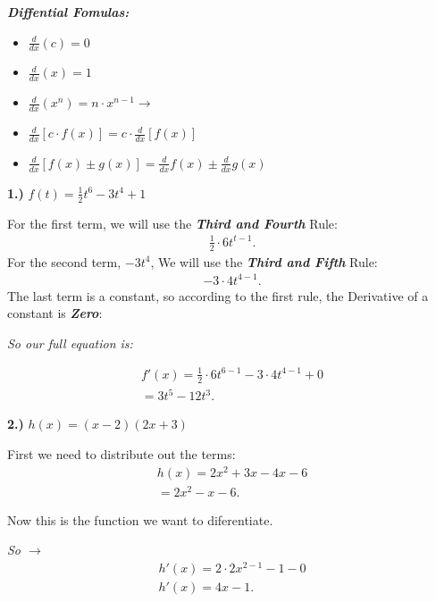 \documentclass{report}
\begin{document}
    \bigbreak \noindent 
    \begin{mdframed}
        \textbf{\textit{Diffential Fomulas:}}
        \begin{itemize}
            \item $ \frac{d}{dx}(c) = 0$
            \item $ \frac{d}{dx}(x) = 1$
            \item $ \frac{d}{dx}(x^n) = n \cdot x^{n-1} \rightarrow$ 
            \item $ \frac{d}{dx}[c \cdot f(x)] = c \cdot \frac{d}{dx}[f(x)]$
            \item $ \frac{d}{dx}[f(x) \pm g(x)] = \frac{d}{dx}f(x)\pm \frac{d}{dx}g(x)$
        \end{itemize}
    \end{mdframed}
    \bigbreak \noindent \bigbreak \noindent 
    \bigbreak \noindent 
    \begin{mdframed}
       \textbf{1.)} $f(t) = \frac{1}{2}t^6 - 3t^4 +1$ 
    \end{mdframed}
  
   \bigbreak \noindent  \bigbreak \noindent 
   For the first term, we will use the \textbf{\textit{Third and Fourth}} Rule:
   \begin{align*}
      \frac{1}{2} \cdot 6t^{t-1}
   .\end{align*}
   \bigbreak \noindent 
   For the second term, \textit{$-3t^4$}, We will use the \textbf{\textit{Third and Fifth}} Rule:
   \begin{align*}
      -3 \cdot 4t^{4-1} 
   .\end{align*}
   \bigbreak \noindent 
   The last term is a constant, so according to the first rule, the Derivative of a constant is \textbf{\textit{Zero}}:

  \begin{center}
    \textit{So our full equation is:}
  \end{center}
  \begin{align*}
    f\prime(x) = \frac{1}{2} \cdot 6t^{6-1} - 3 \cdot 4t^{4-1} + 0 \\ 
    = 3t^5-12t^3 
  .\end{align*}
  
  \bigbreak \noindent \bigbreak \noindent 
  \begin{mdframed}
    \textbf{2.)} $h(x) = (x-2)(2x+3)$ 
  \end{mdframed}
  First we need to distribute out the terms:
  \begin{align*}
    h(x) = 2x^2 + 3x -4x -6 \\ 
    = 2x^2 -x-6
  .\end{align*}
  \bigbreak \noindent 
  \begin{center}
    Now this is the function we want to diferentiate.
  \end{center}
  \bigbreak \noindent 
  \textit{So $\rightarrow$}
  \begin{align*}
    h\prime(x) = 2 \cdot 2x^{2-1} - 1 - 0  \\ 
    h\prime(x) = 4x -1
  .\end{align*}
  
\end{document}
